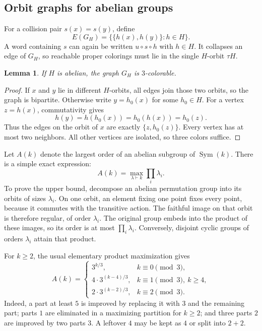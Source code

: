 \documentclass[11pt,a4paper]{article}
\numberwithin{equation}{section}
\newtheorem{lemma}[theorem]{Lemma}
\theoremstyle{definition}
\theoremstyle{remark}
\newcommand{\Sym}{\operatorname{Sym}}
\begin{document}
\subsection{Orbit graphs for abelian groups}

For a collision pair $s(x)=s(y)$, define
\[
 E(G_H)=\{\{h(x),h(y)\}:h\in H\}.
\]
A word containing $s$ can again be written $u\circ s\circ h$ with $h\in H$.
It collapses an edge of $G_H$, so reachable proper colorings must lie in the
single $H$-orbit $\tau H$.

\begin{lemma}\label{lem:abeliangraph}
If $H$ is abelian, the graph $G_H$ is $3$-colorable.
\end{lemma}
\begin{proof}
If $x$ and $y$ lie in different $H$-orbits, all edges join those two orbits,
so the graph is bipartite. Otherwise write $y=h_0(x)$ for some $h_0\in H$.
For a vertex $z=h(x)$, commutativity gives
\[
 h(y)=h(h_0(x))=h_0(h(x))=h_0(z).
\]
Thus the edges on the orbit of $x$ are exactly $\{z,h_0(z)\}$. Every vertex
has at most two neighbors. All other vertices are isolated, so three colors
suffice.
\end{proof}

Let $A(k)$ denote the largest order of an abelian subgroup of $\Sym(k)$.
There is a simple exact expression:
\begin{equation}\label{eq:abelianmax}
 A(k)=\max_{\lambda\vdash k}\prod_i\lambda_i.
\end{equation}
To prove the upper bound, decompose an abelian permutation group into its
orbits of sizes $\lambda_i$. On one orbit, an element fixing one point fixes
every point, because it commutes with the transitive action. The faithful
image on that orbit is therefore regular, of order $\lambda_i$. The original
group embeds into the product of these images, so its order is at most
$\prod_i\lambda_i$. Conversely, disjoint cyclic groups of orders
$\lambda_i$ attain that product.

For $k\ge2$, the usual elementary product maximization gives
\[
 A(k)=
 \begin{cases}
 3^{k/3},&k\equiv0\pmod3,\\
 4\cdot3^{(k-4)/3},&k\equiv1\pmod3,\ k\ge4,\\
 2\cdot3^{(k-2)/3},&k\equiv2\pmod3.
 \end{cases}
\]
Indeed, a part at least $5$ is improved by replacing it with $3$ and the
remaining part; parts $1$ are eliminated in a maximizing partition for
$k\ge2$; and three parts $2$ are improved by two parts $3$. A leftover $4$
may be kept as $4$ or split into $2+2$.
\end{document}

